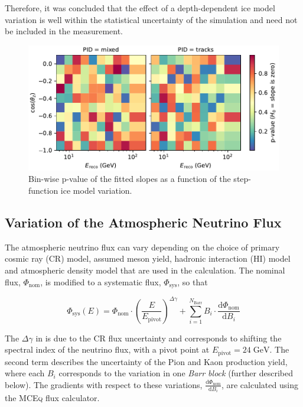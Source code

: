 Therefore, it was concluded that the effect of a depth-dependent ice model variation is well within the statistical uncertainty of the simulation and need not be included in the measurement.
\begin{figure}
    \centering
    \includegraphics[width=0.9\linewidth]{figures/measurement/systematics/detector/ice_perturbation/steppiness_slope_pvals_verification_sample.pdf}
    \caption{Bin-wise p-value of the fitted slopes as a function of the step-function ice model variation.}
    \label{fig:steppiness-pvals}
\end{figure}

\subsection{Variation of the Atmospheric Neutrino Flux}
\label{sec:flux_systs}

The atmospheric neutrino flux can vary depending on the choice of primary cosmic ray (CR) model, assumed meson yield, hadronic interaction (HI) model and atmospheric density model that are used in the calculation.
The nominal flux, $\Phi_\mathrm{nom}$, is modified to a systematic flux, $\Phi_\mathrm{sys}$, so that

\begin{equation}
    \Phi_{\mathrm{sys}}(E) = \Phi_{\mathrm{nom}} \cdot \left( \frac{E}{E_\mathrm{pivot}}\right)^{\Delta \gamma}
    +
    \sum_{i=1}^{N_\mathrm{Barr}} B_i \cdot \frac{\mathrm{d} \Phi_{\mathrm{nom}}}{\mathrm{d}B_i}\label{eq:flux-variation}
\end{equation}

The $\Delta \gamma$ in  is due to the CR flux uncertainty and corresponds to shifting the spectral index of the neutrino flux, with a pivot point at $E_\mathrm{pivot}=24\;\mathrm{GeV}$. The second term describes the uncertainty of the Pion and Kaon production yield, where each $B_i$ corresponds to the variation in one \emph{Barr block} (further described below). The gradients with respect to these variations, $\frac{\mathrm{d} \Phi_{\mathrm{nom}}}{\mathrm{d}B_i}$, are calculated using the \textsc{MCEq}\cite{mceq, fedynitch2012influence,fedynitch2015calculation} flux calculator.

